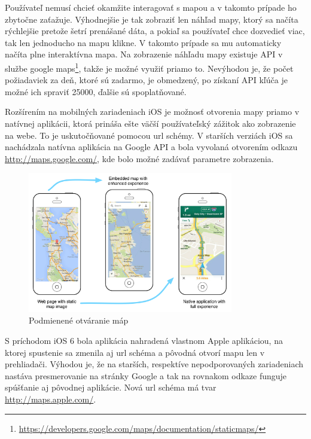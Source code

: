 Používateľ nemusí chcieť okamžite interagovať s mapou a v takomto prípade ho zbytočne zaťažuje. Výhodnejšie je tak zobraziť len náhľad mapy, ktorý sa načíta rýchlejšie pretože šetrí prenášané dáta, a pokiaľ sa používateľ chce dozvedieť viac, tak len jednoducho na mapu klikne. V takomto prípade sa mu automaticky načíta plne interaktívna mapa. Na zobrazenie náhľadu mapy existuje API v službe google maps\footnote{\url{https://developers.google.com/maps/documentation/staticmaps/}}, takže je možné využiť priamo to. Nevýhodou je, že počet požiadaviek za deň, ktoré sú zadarmo, je obmedzený, po získaní API kľúča je možné ich spraviť 25000, ďalšie sú spoplatňované.

Rozšírením na mobilných zariadeniach iOS je možnosť otvorenia mapy priamo v natívnej aplikácii, ktorá prináša ešte väčší používateľský zážitok ako zobrazenie na webe. To je uskutočňované pomocou url schémy. V starších verziách iOS sa nachádzala natívna aplikácia na Google API a bola vyvolaná otvorením odkazu \url{http://maps.google.com/}, kde bolo možné zadávať parametre zobrazenia.


\begin{figure}[H]
  \centering
  \includegraphics[width=0.8\textwidth]{img/maps.png}
  \caption[Podmienené otváranie máp]{
    Podmienené otváranie máp}
\end{figure}

S príchodom iOS 6 bola aplikácia nahradená vlastnom Apple aplikáciou, na ktorej spustenie sa zmenila aj url schéma a pôvodná otvorí mapu len v prehliadači. Výhodou je, že na starších, respektíve nepodporovaných zariadeniach nastáva presmerovanie na stránky Google a tak na rovnakom odkaze funguje spúšťanie aj pôvodnej aplikácie. Nová url schéma má tvar \url{http://maps.apple.com/}.



